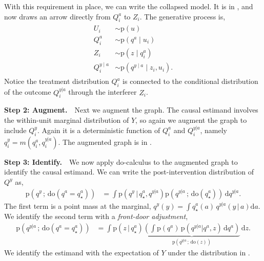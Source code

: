 \documentclass[12pt]{article}
\newcommand{\rmdo}{\mathrm{do}}
\newcommand{\s}{\, ; \,}
\newcommand{\g}{\,\vert\,}
\newcommand{\di}{\mathrm{d}}
\newcommand{\pr}{\mathrm{p}}
\newcommand{\parheadsmall}[1]{\vspace{0.1in} \noindent \textbf{#1} \,\,}
\begin{document}
With this requirement in place, we can write the collapsed model. It is in
, and now draws an arrow directly from
$Q_i^a$ to $Z_i$. The generative process is,
\begin{align}
\begin{split}
U_i &\sim \pr(u)\\
Q_i^a &\sim \pr(q^a \mid u_i)\\
Z_i &\sim \pr(z \mid q_i^a)\\
Q_i^{y \mid a} &\sim \pr(q^{y\mid a} \mid z_i, u_i).
\end{split}
\end{align}
Notice the treatment distribution $Q_i^a$ is connected to the
conditional distribution of the outcome $Q^{y|a}_i$ through the
interferer $Z_{i}$.

\parheadsmall{Step 2: Augment.} Next we augment the graph. The causal
estimand involves the within-unit marginal distribution of $Y$, so
again we augment the graph to include $Q_i^y$. Again it is a
deterministic function of $Q_i^{a}$ and $Q_i^{y|a}$, namely $q^y_i = m(q^a_i, q^{y|a}_i)$. The augmented
graph is in .





\parheadsmall{Step 3: Identify.} We now apply do-calculus to the augmented
graph to identify the causal estimand.  We can write the
post-intervention distribution of $Q^y$ as,
\begin{align}
  \label{eq:interfere_intervention}
  \pr(q^y \s \rmdo(q^a =q^a_\star))
  &=
    \int
    \pr(q^y \g q^a_\star, q^{y|a})
    \pr(q^{y|a} \s \rmdo(q^a_\star)) \, \di q^{y|a}.
\end{align}
The first term is a point mass at the marginal,
$q^y(y) = \int q^a_\star(a) \, q^{y|a}(y \g a) \di a$. We identify the
second term with a \textit{front-door adjustment},
\begin{align}
  \label{eq:interfere_front_door}
  \pr(q^{y|a} \s \rmdo(q^a =q^a_\star))
  &=
    \int
    \pr(z \g q^a_\star)
    \underbrace{
    \left(
    \int
    \pr(q^a) \,
    \pr(q^{y|a} | q^a, z)
    \, \di q^a
    \right)}_{\pr(q^{y|a} \s \rmdo(z))}
    \, \di z.
\end{align}
We identify the estimand with the expectation of $Y$ under the
distribution in .
\end{document}
